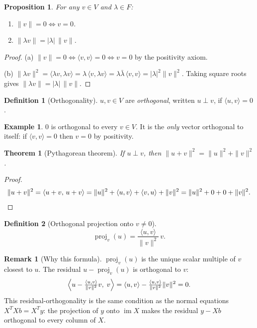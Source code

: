 \documentclass[11pt]{article}
\theoremstyle{definition}
\newtheorem{definition}{Definition}[section]
\newtheorem{example}{Example}[section]
\newtheorem{remark}{Remark}[section]
\theoremstyle{plain}
\newtheorem{theorem}{Theorem}[section]
\newtheorem{proposition}{Proposition}[section]
\begin{document}
\begin{proposition}
  For any $v \in V$ and $\lambda \in F$:
  \begin{enumerate}
    \item[(a)] $\|v\| = 0 \Longleftrightarrow v = 0$.
    \item[(b)] $\|\lambda v\| = |\lambda|\,\|v\|$.
  \end{enumerate}
\end{proposition}
\begin{proof}
  (a) $\|v\| = 0 \Leftrightarrow \langle v,v\rangle = 0 \Leftrightarrow v = 0$
  by the positivity axiom.

  (b) $\|\lambda v\|^2 = \langle \lambda v, \lambda v\rangle
      = \lambda\,\langle v, \lambda v\rangle
      = \lambda\bar\lambda\,\langle v,v\rangle
      = |\lambda|^2\|v\|^2$.
  Taking square roots gives $\|\lambda v\| = |\lambda|\,\|v\|$.
\end{proof}

\begin{definition}[Orthogonality]
  $u, v \in V$ are \emph{orthogonal}, written $u \perp v$, if
  $\langle u, v\rangle = 0$.
\end{definition}

\begin{example}
  $0$ is orthogonal to every $v \in V$.
  It is the \emph{only} vector orthogonal to itself: if $\langle v,v\rangle = 0$
  then $v = 0$ by positivity.
\end{example}

\begin{theorem}[Pythagorean theorem]
  If $u \perp v$, then $\|u + v\|^2 = \|u\|^2 + \|v\|^2$.
\end{theorem}
\begin{proof}
  \[
    \|u+v\|^2
    = \langle u+v,\, u+v\rangle
    = \|u\|^2 + \langle u,v\rangle + \langle v,u\rangle + \|v\|^2
    = \|u\|^2 + 0 + 0 + \|v\|^2. \qedhere
  \]
\end{proof}

\begin{definition}[Orthogonal projection onto $v \neq 0$]
  \[
    \operatorname{proj}_v(u)
    = \frac{\langle u, v\rangle}{\|v\|^2}\,v.
  \]
\end{definition}

\begin{remark}[Why this formula]
  $\operatorname{proj}_v(u)$ is the unique scalar multiple of $v$ closest
  to $u$.  The residual $u - \operatorname{proj}_v(u)$ is orthogonal to $v$:
  \[
    \Bigl\langle u - \tfrac{\langle u,v\rangle}{\|v\|^2}v,\; v\Bigr\rangle
    = \langle u,v\rangle - \tfrac{\langle u,v\rangle}{\|v\|^2}\|v\|^2 = 0.
  \]
  This residual-orthogonality is the same condition as the normal equations
  $X^TXb = X^Ty$: the projection of $y$ onto $\operatorname{im}X$ makes
  the residual $y - Xb$ orthogonal to every column of $X$.
\end{remark}
\end{document}
